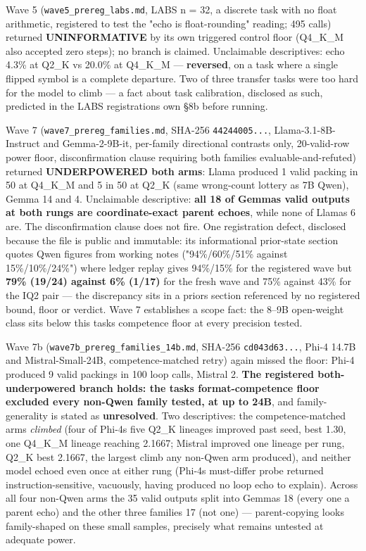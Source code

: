 Wave 5 (\texttt{wave5\_prereg\_labs.md}, LABS n = 32, a discrete task with no float arithmetic, registered to test the "echo is float-rounding" reading; 495 calls) returned \textbf{UNINFORMATIVE} by its own triggered control floor (Q4\_K\_M also accepted zero steps); no branch is claimed. Unclaimable descriptives: echo 4.3\% at Q2\_K vs 20.0\% at Q4\_K\_M --- \textbf{reversed}, on a task where a single flipped symbol is a complete departure. Two of three transfer tasks were too hard for the model to climb --- a fact about task calibration, disclosed as such, predicted in the LABS registration\textquotesingle s own §8b before running.

Wave 7 (\texttt{wave7\_prereg\_families.md}, SHA-256 \texttt{44244005...}, Llama-3.1-8B-Instruct and Gemma-2-9B-it, per-family directional contrasts only, 20-valid-row power floor, disconfirmation clause requiring both families evaluable-and-refuted) returned \textbf{UNDERPOWERED both arms}: Llama produced 1 valid packing in 50 at Q4\_K\_M and 5 in 50 at Q2\_K (same wrong-count lottery as 7B Qwen), Gemma 14 and 4. Unclaimable descriptive: \textbf{all 18 of Gemma\textquotesingle s valid outputs at both rungs are coordinate-exact parent echoes}, while none of Llama\textquotesingle s 6 are. The disconfirmation clause does not fire. One registration defect, disclosed because the file is public and immutable: its informational prior-state section quotes Qwen figures from working notes ("94\%/60\%/51\% against 15\%/10\%/24\%") where ledger replay gives 94\%/15\% for the registered wave but \textbf{79\% (19/24) against 6\% (1/17)} for the fresh wave and 75\% against 43\% for the IQ2 pair --- the discrepancy sits in a priors section referenced by no registered bound, floor or verdict. Wave 7 establishes a scope fact: the 8--9B open-weight class sits below this task\textquotesingle s competence floor at every precision tested.

Wave 7b (\texttt{wave7b\_prereg\_families\_14b.md}, SHA-256 \texttt{cd043d63...}, Phi-4 14.7B and Mistral-Small-24B, competence-matched retry) again missed the floor: Phi-4 produced 9 valid packings in 100 loop calls, Mistral 2. \textbf{The registered both-underpowered branch holds: the task\textquotesingle s format-competence floor excluded every non-Qwen family tested, at up to 24B}, and family-generality is stated as \textbf{unresolved}. Two descriptives: the competence-matched arms \emph{climbed} (four of Phi-4\textquotesingle s five Q2\_K lineages improved past seed, best 1.30, one Q4\_K\_M lineage reaching 2.1667; Mistral improved one lineage per rung, Q2\_K best 2.1667, the largest climb any non-Qwen arm produced), and neither model echoed even once at either rung (Phi-4\textquotesingle s must-differ probe returned instruction-sensitive, vacuously, having produced no loop echo to explain). Across all four non-Qwen arms the 35 valid outputs split into Gemma\textquotesingle s 18 (every one a parent echo) and the other three families\textquotesingle{} 17 (not one) --- parent-copying looks family-shaped on these small samples, precisely what remains untested at adequate power.

